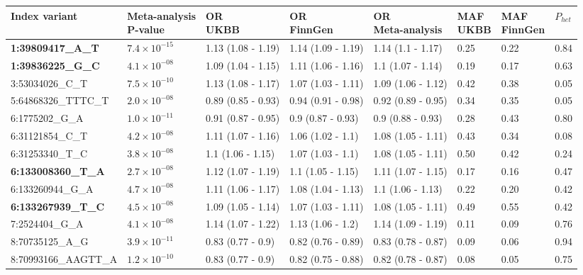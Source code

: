 \begin{table}[H]
\begin{adjustwidth}{-.1in}{-.5in}
\begin{tabular}[t]{p{}llllp{}p{}p{}}
      \toprule
      Index variant & \makecell{Meta-analysis\\P-value} & \makecell{OR\\UKBB} & \makecell{OR\\FinnGen} & \makecell{OR\\ Meta-analysis} & \makecell{MAF\\UKBB} & \makecell{MAF\\FinnGen} & $P_{het}$\\
      \midrule
      \textbf{1:39809417\_A\_T} & $7.4\times10^{-15}$ & 1.13 (1.08 - 1.19) & 1.14 (1.09 - 1.19) & 1.14 (1.1 - 1.17) & 0.25 & 0.22 & 0.84\\
      \textbf{1:39836225\_G\_C} & $4.1\times10^{-08}$ & 1.09 (1.04 - 1.15) & 1.11 (1.06 - 1.16) & 1.1 (1.07 - 1.14) & 0.19 & 0.17 & 0.63\\
      3:53034026\_C\_T & $7.5\times10^{-10}$ & 1.13 (1.08 - 1.17) & 1.07 (1.03 - 1.11) & 1.09 (1.06 - 1.12) & 0.42 & 0.38 & 0.05\\
      5:64868326\_TTTC\_T & $2.0\times10^{-08}$ & 0.89 (0.85 - 0.93) & 0.94 (0.91 - 0.98) & 0.92 (0.89 - 0.95) & 0.34 & 0.35 & 0.05\\
      6:1775202\_G\_A & $1.0\times10^{-11}$ & 0.91 (0.87 - 0.95) & 0.9 (0.87 - 0.93) & 0.9 (0.88 - 0.93) & 0.28 & 0.43 & 0.80\\
      6:31121854\_C\_T & $4.2\times10^{-08}$ & 1.11 (1.07 - 1.16) & 1.06 (1.02 - 1.1) & 1.08 (1.05 - 1.11) & 0.43 & 0.34 & 0.08\\
      6:31253340\_T\_C & $3.8\times10^{-08}$ & 1.1 (1.06 - 1.15) & 1.07 (1.03 - 1.1) & 1.08 (1.05 - 1.11) & 0.50 & 0.42 & 0.24\\
      \textbf{6:133008360\_T\_A} & $2.7\times10^{-08}$ & 1.12 (1.07 - 1.19) & 1.1 (1.05 - 1.15) & 1.11 (1.07 - 1.15) & 0.17 & 0.16 & 0.47\\
      6:133260944\_G\_A & $4.7\times10^{-08}$ & 1.11 (1.06 - 1.17) & 1.08 (1.04 - 1.13) & 1.1 (1.06 - 1.13) & 0.22 & 0.20 & 0.42\\
      \textbf{6:133267939\_T\_C} & $4.5\times10^{-08}$ & 1.09 (1.05 - 1.14) & 1.07 (1.03 - 1.11) & 1.08 (1.05 - 1.11) & 0.49 & 0.55 & 0.42\\
      7:2524404\_G\_A & $4.1\times10^{-08}$ & 1.14 (1.07 - 1.22) & 1.13 (1.06 - 1.2) & 1.14 (1.09 - 1.19) & 0.11 & 0.09 & 0.76\\
      8:70735125\_A\_G & $3.9\times10^{-11}$ & 0.83 (0.77 - 0.9) & 0.82 (0.76 - 0.89) & 0.83 (0.78 - 0.87) & 0.09 & 0.06 & 0.94\\
      8:70993166\_AAGTT\_A & $1.2\times10^{-10}$ & 0.83 (0.77 - 0.9) & 0.82 (0.75 - 0.88) & 0.82 (0.78 - 0.87) & 0.08 & 0.05 & 0.75\\

\end{tabular}
\end{adjustwidth}
\end{table}
